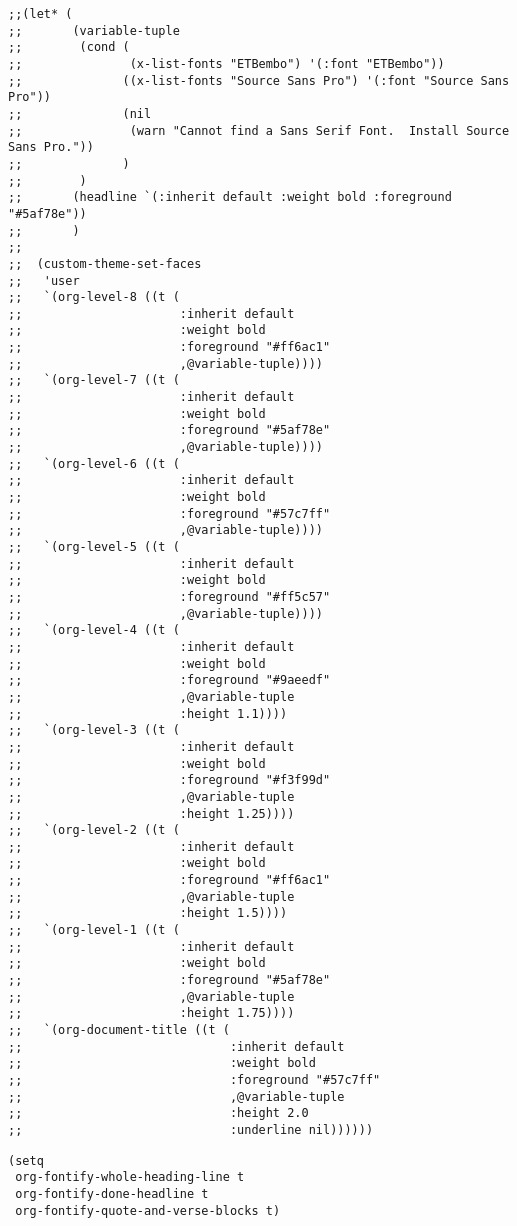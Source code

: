 \documentclass[11pt]{article}
\begin{document}
\begin{verbatim}
;;(let* (
;;       (variable-tuple
;;        (cond (
;;               (x-list-fonts "ETBembo") '(:font "ETBembo"))
;;              ((x-list-fonts "Source Sans Pro") '(:font "Source Sans Pro"))
;;              (nil
;;               (warn "Cannot find a Sans Serif Font.  Install Source Sans Pro."))
;;              )
;;        )
;;       (headline `(:inherit default :weight bold :foreground "#5af78e"))
;;       )
;;
;;  (custom-theme-set-faces
;;   'user
;;   `(org-level-8 ((t (
;;                      :inherit default
;;                      :weight bold
;;                      :foreground "#ff6ac1"
;;                      ,@variable-tuple))))
;;   `(org-level-7 ((t (
;;                      :inherit default
;;                      :weight bold
;;                      :foreground "#5af78e"
;;                      ,@variable-tuple))))
;;   `(org-level-6 ((t (
;;                      :inherit default
;;                      :weight bold
;;                      :foreground "#57c7ff"
;;                      ,@variable-tuple))))
;;   `(org-level-5 ((t (
;;                      :inherit default
;;                      :weight bold
;;                      :foreground "#ff5c57"
;;                      ,@variable-tuple))))
;;   `(org-level-4 ((t (
;;                      :inherit default
;;                      :weight bold
;;                      :foreground "#9aeedf"
;;                      ,@variable-tuple
;;                      :height 1.1))))
;;   `(org-level-3 ((t (
;;                      :inherit default
;;                      :weight bold
;;                      :foreground "#f3f99d"
;;                      ,@variable-tuple
;;                      :height 1.25))))
;;   `(org-level-2 ((t (
;;                      :inherit default
;;                      :weight bold
;;                      :foreground "#ff6ac1"
;;                      ,@variable-tuple
;;                      :height 1.5))))
;;   `(org-level-1 ((t (
;;                      :inherit default
;;                      :weight bold
;;                      :foreground "#5af78e"
;;                      ,@variable-tuple
;;                      :height 1.75))))
;;   `(org-document-title ((t (
;;                             :inherit default
;;                             :weight bold
;;                             :foreground "#57c7ff"
;;                             ,@variable-tuple
;;                             :height 2.0
;;                             :underline nil))))))
\end{verbatim}
\begin{verbatim}
(setq
 org-fontify-whole-heading-line t
 org-fontify-done-headline t
 org-fontify-quote-and-verse-blocks t)
\end{verbatim}
\end{document}
